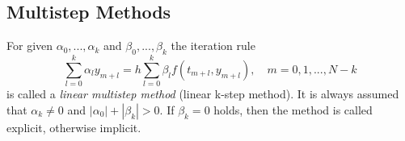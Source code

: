 	
	\subsection{Multistep Methods}
	\begin{frame}
		\vfill
		\begin{definition}
			\label{def:multi step method}
			For given $\alpha_0, ..., \alpha_k$ and $\beta_0, ..., \beta_k$ the iteration rule
			\begin{equation}
				\label{linear-multistep-method}
				\sum_{l=0}^{k} \alpha_l y_{m+l} = h \sum_{l=0}^{k} \beta_l f(t_{m+l}, y_{m+l}), \quad m=0,1,...,N-k
			\end{equation}
			is called a \emph{linear multistep method} (linear k-step method). It is always assumed that $\alpha_k \neq 0$ and $|\alpha_0| + |\beta_k| > 0$. If $\beta_k=0$ holds, then the method is called explicit, otherwise implicit.
		\end{definition}
		\vfill
	\end{frame}
	
